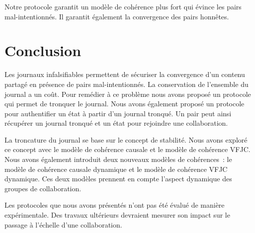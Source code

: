 Notre protocole garantit un modèle de cohérence plus fort qui évince les pairs mal-intentionnés.
Il garantit également la convergence des pairs honnêtes.



\section{Conclusion}

Les journaux infalsifiables permettent de sécuriser la convergence d'un contenu partagé en présence de pairs mal-intentionnés.
La conservation de l'ensemble du journal a un coût.
Pour remédier à ce problème nous avons proposé un protocole qui permet de tronquer le journal.
Nous avons également proposé un protocole pour authentifier un état à partir d'un journal tronqué.
Un pair peut ainsi récupérer un journal tronqué et un état pour rejoindre une collaboration.

La troncature du journal se base sur le concept de stabilité.
Nous avons exploré ce concept avec le modèle de cohérence causale et le modèle de cohérence \ac{VFJC}.
Nous avons également introduit deux nouveaux modèles de cohérences~: le modèle de cohérence causale dynamique et le modèle de cohérence \ac{VFJC} dynamique.
Ces deux modèles prennent en compte l'aspect dynamique des groupes de collaboration.

Les protocoles que nous avons présentés n'ont pas été évalué de manière expérimentale.
Des travaux ultérieurs devraient mesurer son impact sur le passage à l'échelle d'une collaboration.
